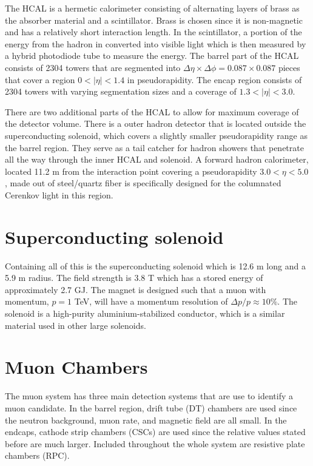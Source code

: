 The HCAL is a hermetic calorimeter consisting of alternating layers of brass as the absorber material and a scintillator. Brass is chosen since it is non-magnetic and has a relatively short interaction length. In the scintillator, a portion of the energy from the hadron in converted into visible light which is then measured by a hybrid photodiode tube to measure the energy. The barrel part of the HCAL consists of 2304 towers that are segmented into $\Delta\eta\times\Delta\phi=0.087\times0.087$ pieces that cover a region $0<|\eta|<1.4$ in pseudorapidity. The encap region consists of 2304 towers with varying segmentation sizes and a coverage of $1.3<|\eta|<3.0$. 

There are two additional parts of the HCAL to allow for maximum coverage of the detector volume. There is a outer hadron detector that is located outside the superconducting solenoid, which covers a slightly smaller pseudorapidity range as the barrel region. They serve as a tail catcher for hadron showers that penetrate all the way through the inner HCAL and solenoid. A forward hadron calorimeter, located 11.2 m from the interaction point covering a pseudorapidity $3.0<\eta<5.0$, made out of steel/quartz fiber is specifically designed for the columnated Cerenkov light in this region. 

\section{Superconducting solenoid}
\label{sec:Solenoid}

Containing all of this is the superconducting solenoid which is 12.6 m long and a 5.9 m radius. The field strength is 3.8 T which has a stored energy of approximately 2.7 GJ. The magnet is designed such that a muon with momentum, $p=1$ TeV, will have a momentum resolution of $\Delta p/p\approx10\%$. The solenoid is a high-purity aluminium-stabilized conductor, which is a similar material used in other large solenoids. 

\section{Muon Chambers}
\label{sec:muCham}

The muon system has three main detection systems that are use to identify a muon candidate. In the barrel region, drift tube (DT) chambers are used since the neutron background, muon rate, and magnetic field are all small. In the endcaps, cathode strip chambers (CSCs) are used since the relative values stated before are much larger. Included throughout the whole system are resistive plate chambers (RPC). 


